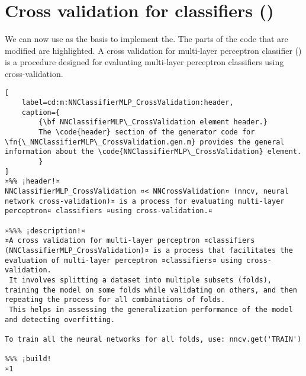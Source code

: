 \documentclass{tufte-handout}
\begin{document}
\clearpage

\section{Cross validation for classifiers ()}

We can now use  as the basis to implement the. The parts of the code that are modified are highlighted.
A cross validation for multi-layer perceptron classifier () is a procedure designed for evaluating multi-layer perceptron classifiers using cross-validation. 

\begin{lstlisting}[
	label=cd:m:NNClassifierMLP_CrossValidation:header,
	caption={
		{\bf NNClassifierMLP\_CrossValidation element header.}
		The \code{header} section of the generator code for \fn{\_NNClassifierMLP\_CrossValidation.gen.m} provides the general information about the \code{NNClassifierMLP\_CrossValidation} element.
		}
]
¤%% ¡header!¤
NNClassifierMLP_CrossValidation ¤< NNCrossValidation¤ (nncv, neural network cross-validation)¤ is a process for evaluating multi-layer perceptron¤ classifiers ¤using cross-validation.¤

¤%%% ¡description!¤
¤A cross validation for multi-layer perceptron ¤classifiers (NNClassifierMLP_CrossValidation)¤ is a process that facilitates the evaluation of multi-layer perceptron ¤classifiers¤ using cross-validation. 
 It involves splitting a dataset into multiple subsets (folds), training the model on some folds while validating on others, and then repeating the process for all combinations of folds. 
 This helps in assessing the generalization performance of the model and detecting overfitting.

To train all the neural networks for all folds, use: nncv.get('TRAIN')

%%% ¡build!
¤1
\end{lstlisting}
\end{document}
